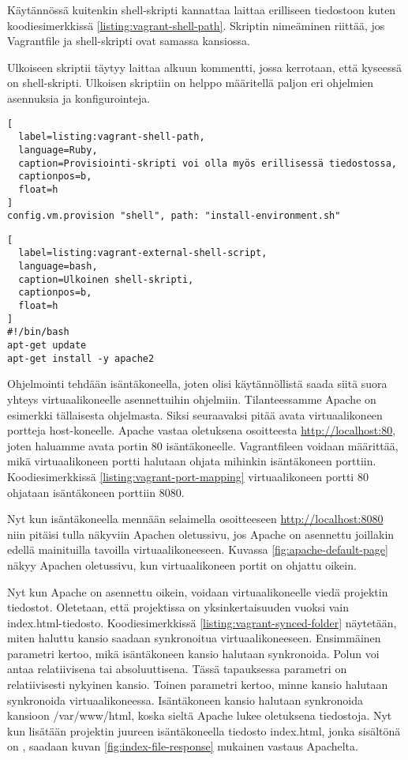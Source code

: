 Käytännössä kuitenkin shell-skripti kannattaa laittaa erilliseen tiedostoon kuten koodiesimerkkissä \ref{listing:vagrant-shell-path}. Skriptin nimeäminen riittää, jos Vagrantfile ja shell-skripti ovat samassa kansiossa.

Ulkoiseen skriptii täytyy laittaa alkuun kommentti, jossa kerrotaan, että kyseessä on shell-skripti. Ulkoisen skriptiin on helppo määritellä paljon eri ohjelmien asennuksia ja konfigurointeja.

\begin{lstlisting}[
  label=listing:vagrant-shell-path,
  language=Ruby,
  caption=Provisiointi-skripti voi olla myös erillisessä tiedostossa,
  captionpos=b,
  float=h
]
config.vm.provision "shell", path: "install-environment.sh"
\end{lstlisting}

\begin{lstlisting}[
  label=listing:vagrant-external-shell-script,
  language=bash,
  caption=Ulkoinen shell-skripti,
  captionpos=b,
  float=h
]
#!/bin/bash
apt-get update
apt-get install -y apache2
\end{lstlisting}

Ohjelmointi tehdään isäntäkoneella, joten olisi käytännöllistä saada siitä suora yhteys virtuaalikoneelle asennettuihin ohjelmiin. Tilanteessamme Apache on esimerkki tällaisesta ohjelmasta. Siksi seuraavaksi pitää avata virtuaalikoneen portteja host-koneelle. Apache vastaa oletuksena osoitteesta \url{http://localhost:80}, joten haluamme avata portin 80 isäntäkoneelle. Vagrantfileen voidaan määrittää, mikä virtuaalikoneen portti halutaan ohjata mihinkin isäntäkoneen porttiin. Koodiesimerkkissä \ref{listing:vagrant-port-mapping} virtuaalikoneen portti 80 ohjataan isäntäkoneen porttiin 8080.

Nyt kun isäntäkoneella mennään selaimella osoitteeseen \url{http://localhost:8080} niin pitäisi tulla näkyviin Apachen oletussivu, jos Apache on asennettu joillakin edellä mainituilla tavoilla virtuaalikoneeseen. Kuvassa \ref{fig:apache-default-page} näkyy Apachen oletussivu, kun virtuaalikoneen portit on ohjattu oikein.

Nyt kun Apache on asennettu oikein, voidaan virtuaalikoneelle viedä projektin tiedostot. Oletetaan, että projektissa on yksinkertaisuuden vuoksi vain index.html-tiedosto. Koodiesimerkkissä \ref{listing:vagrant-synced-folder} näytetään, miten haluttu kansio saadaan synkronoitua virtuaalikoneeseen. Ensimmäinen parametri kertoo, mikä isäntäkoneen kansio halutaan synkronoida. Polun voi antaa relatiivisena tai absoluuttisena. Tässä tapauksessa parametri on relatiivisesti nykyinen kansio. Toinen parametri kertoo, minne kansio halutaan synkronoida virtuaalikoneessa. Isäntäkoneen kansio halutaan synkronoida kansioon /var/www/html, koska sieltä Apache lukee oletuksena tiedostoja. Nyt kun lisätään projektin juureen isäntäkoneella tiedosto index.html, jonka sisältönä on , saadaan kuvan \ref{fig:index-file-response} mukainen vastaus Apachelta.

